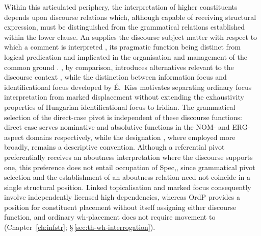 Within this articulated periphery, the interpretation of higher constituents
depends upon discourse relations which, although capable of receiving
structural expression, must be distinguished from the grammatical relations
established within the lower clause. An  supplies the
discourse subject matter with respect to which a comment is interpreted
\cite[chs.~4--5]{lambrecht1994}, its pragmatic function being distinct from
logical predication \cite[§4]{gecseg2006} and implicated in the organisation
and management of the common ground \cite[§2.2]{krifka2008}. ,
by comparison, introduces alternatives relevant to the discourse context
\cite{rooth1992}, while the distinction between information focus and
identificational focus developed by É.~Kiss \cite{ekiss1998} motivates
separating ordinary focus interpretation from marked displacement without
extending the exhaustivity properties of Hungarian identificational focus to
Iridian. The grammatical selection of the direct-case pivot is independent
of these discourse functions: direct case serves nominative and absolutive
functions in the NOM- and ERG-aspect domains respectively, while the
designation , where employed more broadly, remains a
descriptive convention. Although a referential pivot preferentially receives
an aboutness interpretation where the discourse supports one, this
preference does not entail occupation of Spec,, since
grammatical pivot selection and the establishment of an aboutness relation
need not coincide in a single structural position. Linked topicalisation and
marked focus consequently involve independently licensed high dependencies,
whereas OrdP provides a position for constituent placement without itself
assigning either discourse function, and ordinary wh-placement does not
require movement to  (Chapter~\ref{ch:infstr};
§\,\ref{sec:th-wh-interrogation}).

